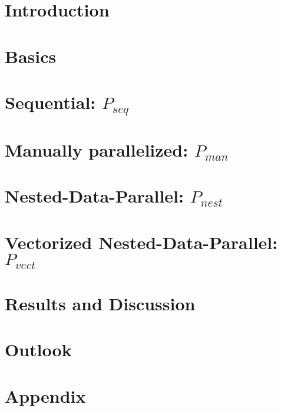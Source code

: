 \documentclass[draft=false
              ,paper=a4
              ,twoside=false
              ,fontsize=11pt
              ,headsepline
              ,BCOR10mm
              ,DIV11
              ]{scrbook}
\newcommand{\seq}[0]{$P_{seq}$\xspace}
\newcommand{\man}[0]{$P_{man}$\xspace}
\newcommand{\ndpn}[0]{$P_{nest}$\xspace}
\newcommand{\ndpv}[0]{$P_{vect}$\xspace}
\begin{document}
\mainmatter
\onehalfspacing

\chapter{Introduction}
  

\chapter{Basics}
  \label{chapter:basics}
  
  
\chapter{Sequential: \seq}
  \label{chapter:seq}
  
  
\chapter{Manually parallelized: \man}
  \label{chapter:man}
  

\chapter{Nested-Data-Parallel: \ndpn}
  \label{chapter:ndpn}
  

\chapter{Vectorized Nested-Data-Parallel: \ndpv}
  \label{chapter:ndpv}
  

\chapter{Results and Discussion}
  \label{chapter:results}
  

\chapter{Outlook}
  \label{chapter:outlook}
  


\chapter*{Appendix}
  
\end{document}
